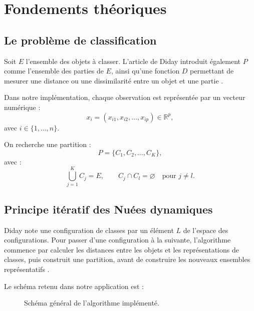 \documentclass[12pt,a4paper]{article}
\begin{document}
\section{Fondements théoriques}

\subsection{Le problème de classification}

Soit $E$ l'ensemble des objets à classer. L'article de Diday introduit également $P$ comme l'ensemble des parties de $E$, ainsi qu'une fonction $D$ permettant de mesurer une distance ou une dissimilarité entre un objet et une partie \cite[p.~20]{diday1971}.

Dans notre implémentation, chaque observation est représentée par un vecteur numérique :
\[
x_i=(x_{i1},x_{i2},\ldots,x_{ip})\in\mathbb{R}^{p},
\]
avec $i\in\{1,\ldots,n\}$.

On recherche une partition :
\[
P=\{C_1,C_2,\ldots,C_K\},
\]
avec :
\[
\bigcup_{j=1}^{K}C_j=E,
\qquad
C_j\cap C_l=\varnothing\quad\text{pour }j\neq l.
\]

\subsection{Principe itératif des Nuées dynamiques}

Diday note une configuration de classes par un élément $L$ de l'espace des configurations. Pour passer d'une configuration à la suivante, l'algorithme commence par calculer les distances entre les objets et les représentations de classes, puis construit une partition, avant de construire les nouveaux ensembles représentatifs \cite[p.~21]{diday1971}.

Le schéma retenu dans notre application est :

\begin{figure}[H]
\centering
{}
\caption{Schéma général de l'algorithme implémenté.}
\end{figure}
\end{document}
